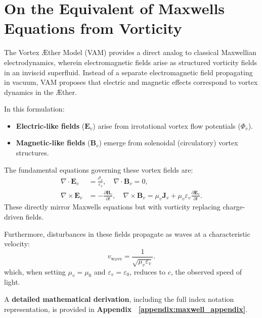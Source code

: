 \section{On the Equivalent of Maxwell\rqs s Equations from Vorticity}

The Vortex Æther Model (VAM) provides a direct analog to classical Maxwellian electrodynamics, wherein electromagnetic fields arise as structured vorticity fields in an inviscid superfluid. Instead of a separate electromagnetic field propagating in vacuum, VAM proposes that electric and magnetic effects correspond to vortex dynamics in the Æther.

In this formulation:
\begin{itemize}
    \item \textbf{Electric-like fields} (\(\mathbf{E}_v\)) arise from irrotational vortex flow potentials (\(\Phi_v\)).
    \item \textbf{Magnetic-like fields} (\(\mathbf{B}_v\)) emerge from solenoidal (circulatory) vortex structures.
\end{itemize}

The fundamental equations governing these vortex fields are:
\begin{align}
    \nabla \cdot \mathbf{E}_v &= \frac{\rho_v}{\varepsilon_v}, \quad \nabla \cdot \mathbf{B}_v = 0, \label{eq:gauss_vam} \\
    \nabla \times \mathbf{E}_v &= -\frac{\partial \mathbf{B}_v}{\partial t}, \quad \nabla \times \mathbf{B}_v = \mu_v \mathbf{J}_v + \mu_v \varepsilon_v \frac{\partial \mathbf{E}_v}{\partial t}. \label{eq:maxwell_vam}
\end{align}
These directly mirror Maxwell\rqs s equations but with vorticity replacing charge-driven fields.

Furthermore, disturbances in these fields propagate as waves at a characteristic velocity:
\begin{equation}
    v_\text{wave} = \frac{1}{\sqrt{\mu_v \varepsilon_v}}.
\end{equation}
which, when setting \(\mu_v = \mu_0\) and \(\varepsilon_v = \varepsilon_0\), reduces to \( c \), the observed speed of light.

A \textbf{detailed mathematical derivation}, including the full index notation representation, is provided in \textbf{Appendix~
\ref{appendix:maxwell_appendix}}.